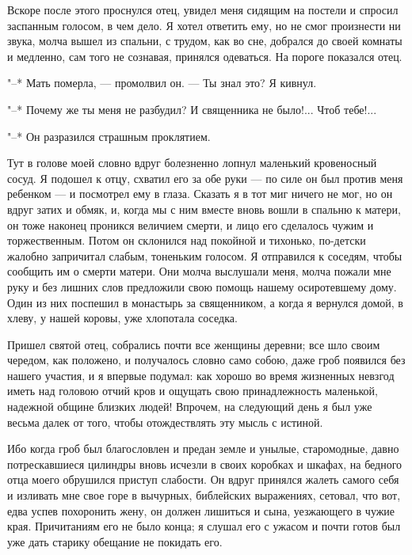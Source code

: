 Вскоре после  этого проснулся отец,  увидел меня сидящим на  постели и
спросил заспанным  голосом, в чем  дело. Я  хотел ответить ему,  но не
смог произнести  ни звука, молча  вышел из  спальни, с трудом,  как во
сне,  добрался до  своей комнаты  и  медленно, сам  того не  сознавая,
принялся одеваться. На пороге показался отец.

"--* Мать померла, --- промолвил он. --- Ты знал это? Я кивнул.

"--* Почему  же ты  меня не  разбудил? И  священника не  было!... Чтоб
тебе!...

"--* Он разразился страшным проклятием.

Тут в голове моей словно вдруг болезненно лопнул маленький кровеносный
сосуд. Я подошел  к отцу, схватил его  за обе руки --- по  силе он был
против меня ребенком --- и посмотрел ему  в глаза. Сказать я в тот миг
ничего  не  мог,  но он  вдруг  затих  и  обмяк,  и, когда  мы  с  ним
вместе  вновь вошли  в  спальню  к матери,  он  тоже наконец  проникся
величием смерти, и лицо его  сделалось чужим и торжественным. Потом он
склонился  над  покойной  и  тихонько,  по-детски  жалобно  запричитал
слабым, тоненьким голосом. Я отправился к соседям, чтобы сообщить им о
смерти матери. Они  молча выслушали меня, молча пожали мне  руку и без
лишних слов предложили  свою помощь нашему осиротевшему  дому. Один из
них поспешил в  монастырь за священником, а когда я  вернулся домой, в
хлеву, у нашей коровы, уже хлопотала соседка.

Пришел святой отец, собрались почти все женщины деревни; все шло своим
чередом,  как положено,  и  получалось словно  само  собою, даже  гроб
появился без нашего участия, и я  впервые подумал: как хорошо во время
жизненных  невзгод  иметь  над  головою  отчий  кров  и  ощущать  свою
принадлежность маленькой,  надежной общине близких людей!  Впрочем, на
следующий день я был уже весьма далек от того, чтобы отождествлять эту
мысль с истиной.

Ибо когда гроб был благословлен  и предан земле и унылые, старомодные,
давно потрескавшиеся цилиндры вновь исчезли в своих коробках и шкафах,
на бедного  отца моего обрушился  приступ слабости. Он  вдруг принялся
жалеть самого  себя и  изливать мне свое  горе в  вычурных, библейских
выражениях, сетовал,  что вот, едва  успев похоронить жену,  он должен
лишиться  и сына,  уезжающего в  чужие края.  Причитаниям его  не было
конца;  я слушал  его с  ужасом  и почти  готов был  уже дать  старику
обещание не покидать его.

